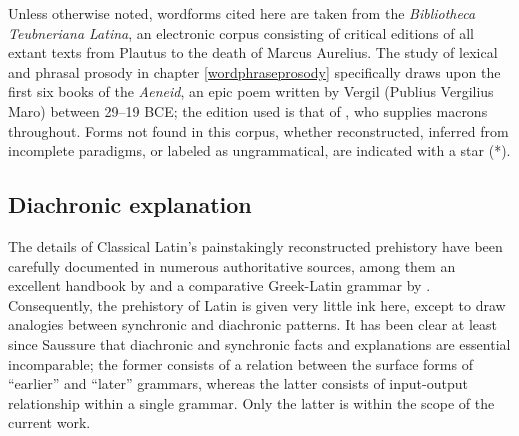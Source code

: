 Unless otherwise noted, wordforms cited here are taken from the \emph{Bibliotheca Teubneriana Latina}, an electronic corpus consisting of critical editions of all extant texts from Plautus to the death of Marcus Aurelius.
The study of lexical and phrasal prosody in chapter \ref{wordphraseprosody} specifically draws upon the first six books of the \emph{Aeneid}, an epic poem written by Vergil (Publius Vergilius Maro) between 29--19 BCE; the edition used is that of \citet{Pharr1964}, who supplies macrons throughout.
Forms not found in this corpus, whether reconstructed, inferred from incomplete paradigms, or labeled as ungrammatical, are indicated with a star (*).


\subsection{Diachronic explanation}

The details of Classical Latin's painstakingly reconstructed prehistory have been carefully documented in numerous authoritative sources,
among them an excellent handbook by \citet{Sommer1902} and a comparative Greek-Latin grammar by \citet{Sihler1995}.
Consequently, the prehistory of Latin is given very little ink here, except to draw analogies between synchronic and diachronic patterns.
It has been clear at least since Saussure that diachronic and synchronic facts and explanations are essential incomparable; the former consists of a relation between the surface forms of ``earlier'' and ``later'' grammars, whereas the latter consists of input-output relationship within a single grammar.
Only the latter is within the scope of the current work.

